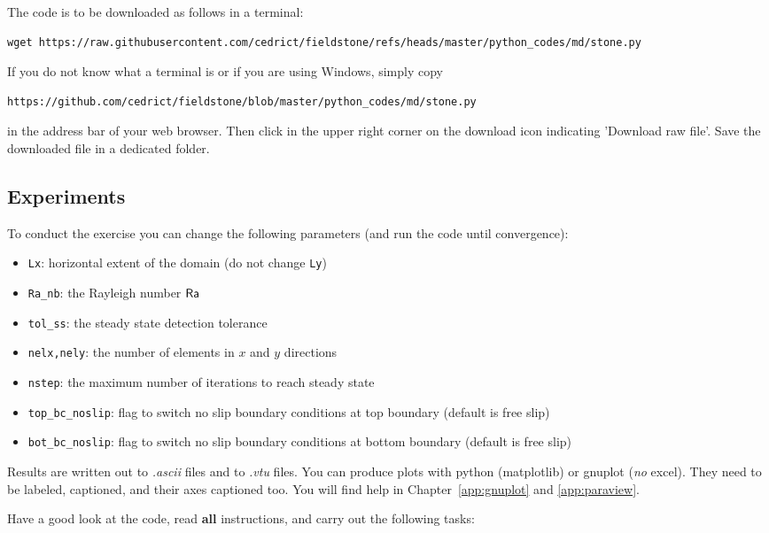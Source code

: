 The code is to be downloaded as follows in a terminal:
{\small
\begin{verbatim}
wget https://raw.githubusercontent.com/cedrict/fieldstone/refs/heads/master/python_codes/md/stone.py
\end{verbatim}
}
If you do not know what a terminal is or if you are using Windows, simply copy 
{\small
\begin{verbatim}
https://github.com/cedrict/fieldstone/blob/master/python_codes/md/stone.py
\end{verbatim}
}
in the address bar of your web browser. Then click in the upper right corner on the 
download icon indicating 'Download raw file'. Save the downloaded file in a dedicated folder. 


\subsection{Experiments}

To conduct the exercise you can change the following parameters (and run the code until convergence):
\begin{itemize}
\item {\tt Lx}: horizontal extent of the domain (do not change {\tt Ly})
\item {\tt Ra\_nb}: the Rayleigh number ${\mathsf{Ra}}$
\item {\tt tol\_ss}: the steady state detection tolerance
\item {\tt nelx,nely}: the number of elements in $x$ and $y$ directions 
\item {\tt nstep}: the maximum number of iterations to reach steady state
\item {\tt top\_bc\_noslip}: flag to switch no slip boundary conditions at top boundary (default is free slip)
\item {\tt bot\_bc\_noslip}: flag to switch no slip boundary conditions at 
      bottom boundary (default is free slip)
\end{itemize}

Results are written out to {\sl .ascii} files and to {\sl .vtu} files. You can produce 
plots with python (matplotlib) or gnuplot ({\it no} excel). They need to be 
labeled, captioned, and their axes captioned too.  
You will find help in Chapter~\ref{app:gnuplot} and \ref{app:paraview}. 

Have a good look at the code, read {\bf all} instructions, and carry out the following tasks:


